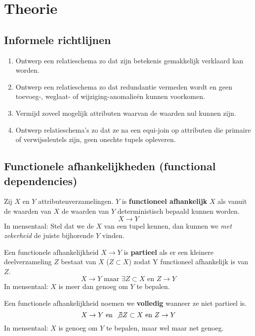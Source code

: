 \documentclass[normaalvormen.tex]{subfiles}
\begin{document}
\chapter{Theorie}
\section{Informele richtlijnen}
\begin{enumerate}
\item Ontwerp een relatieschema zo dat zijn betekenis gemakkelijk verklaard kan worden.

\item Ontwerp een relatieschema zo dat redundantie vermeden wordt en geen toevoeg-, weglaat- of wijziging-anomalie\"en kunnen voorkomen.

\item Vermijd zoveel mogelijk attributen waarvan de waarden nul kunnen zijn.

\item Ontwerp relatieschema's zo dat ze na een equi-join op attributen die primaire of verwijssleutels zijn, geen onechte tupels opleveren.
\end{enumerate}


\section{Functionele afhankelijkheden (functional dependencies)}
\begin{de}
Zij  $X$ en $Y$ attributenverzamelingen. $Y$ is \textbf{functioneel afhankelijk} $X$ als vanuit de waarden van $X$ de waarden van $Y$ deterministisch bepaald kunnen worden.
\[
X\rightarrow Y
\]
In mensentaal:
Stel dat we de $X$ van een tupel kennen, dan kunnen we \emph{met zekerheid} de juiste bijhorende $Y$ vinden.
\end{de}

\begin{de}
Een functionele afhankelijkheid $X\rightarrow Y$ is \textbf{partieel} als er een kleinere deelverzameling $Z$ bestaat van $X$ ($Z\subset X$) zodat Y functioneel afhankelijk is van $Z$.
\[
X \rightarrow Y \text{ maar } \exists Z \subset X \text{ en } Z \rightarrow Y
\]
In mensentaal:
$X$ is meer dan genoeg om $Y$ te bepalen.
\end{de}

\begin{de}
Een functionele afhankelijkheid noemen we \textbf{volledig} wanneer ze niet partieel is.
\[
X \rightarrow Y \text{ en } \not\exists Z \subset X \text{ en } Z \rightarrow Y
\]
In mensentaal:
$X$ is genoeg om $Y$ te bepalen, maar wel maar net genoeg.
\end{de}
\end{document}
